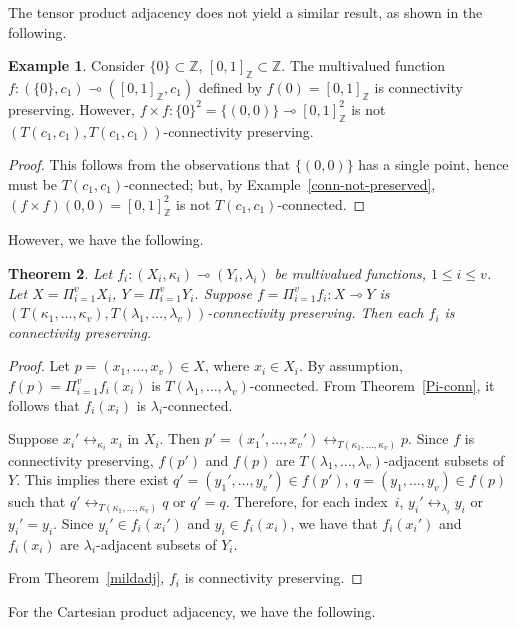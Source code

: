 \documentclass{article}
\theoremstyle{plain}
\newtheorem{thm}{Theorem}
\theoremstyle{definition}
\newtheorem{exl}[thm]{Example}
\numberwithin{thm}{section}
\newcommand{\adj}{\leftrightarrow}
\def\Z{{\mathbb Z}}
\begin{document}
The tensor product adjacency does
not yield a similar result, as
shown in the following.

\begin{exl}
Consider $\{0\} \subset \Z$,
$[0,1]_{\Z} \subset \Z$. The
multivalued function
$f: (\{0\},c_1) \multimap ([0,1]_{\Z}, c_1)$
defined by $f(0)=[0,1]_{\Z}$
is connectivity preserving. However,
$f \times f: \{0\}^2 = \{(0,0)\}
\multimap [0,1]_{\Z}^2$ is not $(T(c_1,c_1),T(c_1,c_1))$-connectivity
preserving.
\end{exl}

\begin{proof}
This follows from the observations
that $\{(0,0)\}$ has a single point, hence must be $T(c_1,c_1)$-connected; but, by Example~\ref{conn-not-preserved},
$(f \times f)(0,0)=[0,1]_{\Z}^2$ is not $T(c_1,c_1)$-connected.
\end{proof}

However, we have the following.

\begin{thm}
Let $f_i: (X_i,\kappa_i) \multimap
(Y_i,\lambda_i)$ be multivalued
functions, $1 \le i \le v$. Let
$X = \Pi_{i=1}^v X_i$, $Y=\Pi_{i=1}^v Y_i$. Suppose
$f=\Pi_{i=1}^v f_i: X \multimap Y$
is $(T(\kappa_1,\ldots,\kappa_v),
T(\lambda_1, \ldots, \lambda_v))$-connectivity preserving. Then each $f_i$ is
connectivity preserving.
\end{thm}

\begin{proof}
Let $p=(x_1,\ldots,x_v) \in X$,
where $x_i \in X_i$. By
assumption, $f(p)=\Pi_{i=1}^v f_i(x_i)$ is $T(\lambda_1, \ldots, \lambda_v)$-connected. From Theorem~\ref{Pi-conn}, it follows
that $f_i(x_i)$ is $\lambda_i$-connected.

Suppose $x_i' \adj_{\kappa_i} x_i$ in $X_i$. Then $p'= (x_1',\ldots,x_v') \adj_{T(\kappa_1,\ldots,\kappa_v)} p$. Since $f$ is connectivity preserving, 
$f(p')$ and $f(p)$ are $T(\lambda_1,\ldots,\lambda_v)$-adjacent subsets of $Y$. This implies there exist
$q'=(y_1',\ldots,y_v') \in f(p')$, $q = (y_1, \ldots, y_v) \in f(p)$ such
that $q' \adj_{T(\kappa_1,\ldots,\kappa_v)} q$ or $q'=q$. Therefore,
for each index~$i$, $y_i' \adj_{\lambda_i} y_i$ or $y_i'=y_i$.
Since $y_i' \in f_i(x_i')$ and
$y_i \in f_i(x_i)$, we have that
$f_i(x_i')$ and $f_i(x_i)$ are
$\lambda_i$-adjacent subsets of
$Y_i$.

From Theorem~\ref{mildadj}, $f_i$
is connectivity preserving.
\end{proof}

For the Cartesian product adjacency,
we have the following.
\end{document}
